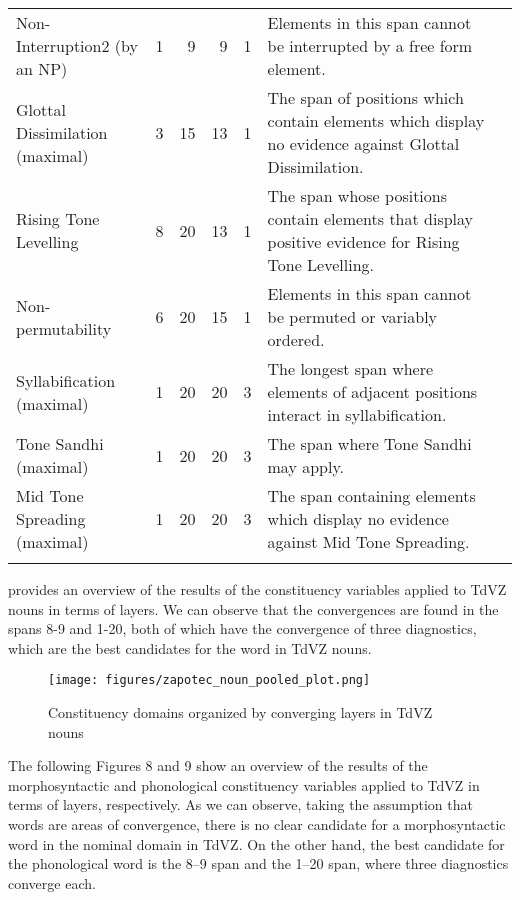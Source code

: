 \documentclass[output=paper]{langscibook}
\begin{document}
\begin{longtable}{p{2.5cm}rrrrp{5.5cm}c}
\raggedright Non-Interruption2 (by an NP) & 1 & 9 & 9 & 1          & \raggedright Elements in this span cannot be interrupted by a free form element.&\\
\raggedright Glottal Dissimilation (maximal) & 3 & 15 & 13 & 1     & \raggedright The span of positions which contain elements which display no evidence against Glottal Dissimilation. &\\
\raggedright Rising Tone Levelling & 8 & 20 & 13 & 1               & \raggedright The span whose positions contain elements that display positive evidence for Rising Tone Levelling.&\\
\raggedright Non-permutability & 6 & 20 & 15 & 1                   & \raggedright Elements in this span cannot be permuted or variably ordered.&\\
\raggedright Syllabification (maximal) & 1 & 20 & 20 & 3           & \raggedright The longest span where elements of adjacent positions interact in syllabification.&\\
\raggedright Tone Sandhi (maximal) & 1 & 20 & 20 & 3               & \raggedright The span where Tone Sandhi may apply.&\\
\raggedright Mid Tone Spreading (maximal) & 1 & 20 & 20 & 3        & \raggedright The span containing elements which display no evidence against Mid Tone Spreading.&\\
\lspbottomrule
\label{tab:key:zap:4}
\end{longtable}


 provides an overview of the results of the constituency variables applied to TdVZ nouns in terms of layers. We can observe that the convergences are found in the spans 8-9 and 1-20, both of which have the convergence of three diagnostics, which are the best candidates for the word in TdVZ nouns.

\begin{figure}
\texttt{[image: figures/zapotec\_noun\_pooled\_plot.png]}
\caption{Constituency domains organized by converging layers in TdVZ nouns}
\label{fig:key:zap:4}
\end{figure}

The following Figures 8 and 9 show an overview of the results of the morphosyntactic and phonological constituency variables applied to TdVZ in terms of layers, respectively. As we can observe, taking the assumption that words are areas of convergence, there is no clear candidate for a morphosyntactic word in the nominal domain in TdVZ. On the other hand, the best candidate for the phonological word is the 8–9 span and the 1–20 span, where three diagnostics converge each.
\end{document}
